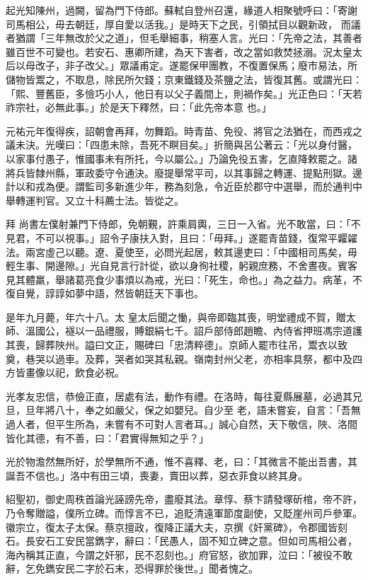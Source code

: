 \begin{pinyinscope}
 起光知陳州，過闕，留為門下侍郎。蘇軾自登州召還，緣道人相聚號呼曰：「寄謝司馬相公，毋去朝廷，厚自愛以活我。」是時天下之民，引領拭目以觀新政，
 而議者猶謂「三年無改於父之道」，但毛舉細事，稍塞人言。光曰：「先帝之法，其善者雖百世不可變也。若安石、惠卿所建，為天下害者，改之當如救焚拯溺。況太皇太后以母改子，非子改父。」眾議甫定。遂罷保甲團教，不復置保馬；廢市易法，所儲物皆鬻之，不取息，除民所欠錢；京東鐵錢及茶鹽之法，皆復其舊。或謂光曰：「熙、豐舊臣，多憸巧小人，他日有以父子義間上，則禍作矣。」光正色曰：「天若祚宗社，必無此事。」於是天下釋然，曰：「此先帝本意
 也。」



 元祐元年復得疾，詔朝會再拜，勿舞蹈。時青苗、免役、將官之法猶在，而西戎之議未決。光嘆曰：「四患未除，吾死不瞑目矣。」折簡與呂公著云：「光以身付醫，以家事付愚子，惟國事未有所托，今以屬公。」乃論免役五害，乞直降敕罷之。諸將兵皆隸州縣，軍政委守令通決。廢提舉常平司，以其事歸之轉運、提點刑獄。邊計以和戎為便。謂監司多新進少年，務為刻急，令近臣於郡守中選舉，而於通判中舉轉運判官。又立十科薦士法。皆從之。



 拜
 尚書左僕射兼門下侍郎，免朝覲，許乘肩輿，三日一入省。光不敢當，曰：「不見君，不可以視事。」詔令子康扶入對，且曰：「毋拜。」遂罷青苗錢，復常平糶糴法。兩宮虛己以聽。遼、夏使至，必問光起居，敕其邊吏曰：「中國相司馬矣，毋輕生事、開邊隙。」光自見言行計從，欲以身徇社稷，躬親庶務，不舍晝夜。賓客見其體羸，舉諸葛亮食少事煩以為戒，光曰：「死生，命也。」為之益力。病革，不復自覺，諄諄如夢中語，然皆朝廷天下事也。



 是年九月薨，年六十八。太
 皇太后聞之慟，與帝即臨其喪，明堂禮成不賀，贈太師、溫國公，襚以一品禮服，賻銀絹七千。詔戶部侍郎趙瞻、內侍省押班馮宗道護其喪，歸葬陜州。謚曰文正，賜碑曰「忠清粹德」。京師人罷市往吊，鬻衣以致奠，巷哭以過車。及葬，哭者如哭其私親。嶺南封州父老，亦相率具祭，都中及四方皆畫像以祀，飲食必祝。



 光孝友忠信，恭儉正直，居處有法，動作有禮。在洛時，每往夏縣展墓，必過其兄旦，旦年將八十，奉之如嚴父，保之如嬰兒。自少至
 老，語未嘗妄，自言：「吾無過人者，但平生所為，未嘗有不可對人言者耳。」誠心自然，天下敬信，陜、洛間皆化其德，有不善，曰：「君實得無知之乎？」



 光於物澹然無所好，於學無所不通，惟不喜釋、老，曰：「其微言不能出吾書，其誕吾不信也。」洛中有田三頃，喪妻，賣田以葬，惡衣菲食以終其身。



 紹聖初，御史周秩首論光誣謗先帝，盡廢其法。章惇、蔡卞請發塚斫棺，帝不許，乃令奪贈謚，僕所立碑。而惇言不已，追貶清遠軍節度副使，又貶崖州司戶參軍。
 徽宗立，復太子太保。蔡京擅政，復降正議大夫，京撰《奸黨碑》，令郡國皆刻石。長安石工安民當鐫字，辭曰：「民愚人，固不知立碑之意。但如司馬相公者，海內稱其正直，今謂之奸邪，民不忍刻也。」府官怒，欲加罪，泣曰：「被役不敢辭，乞免鐫安民二字於石末，恐得罪於後世。」聞者愧之。




\end{pinyinscope}
